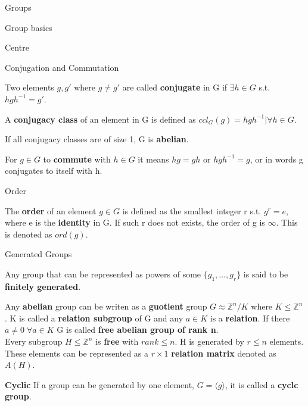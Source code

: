 \documentclass[12pt, letterpaper]{article}
\begin{document}
\begin{section}{Groups}
\begin{subsection}{Group basics}
\begin{subsubsection}{Centre}
    \end{subsubsection}

    \begin{subsubsection}{Conjugation and Commutation}

      Two elements \(g, g'\) where \(g \neq g'\) are called \textbf{conjugate} in G
      if \(\exists h \in G \) s.t. \(hgh^{-1} = g'\).

      A \textbf{conjugacy class} of an element in G is defined as
      \(ccl_{G}(g) = {hgh^{-1} | \forall h \in G}\).

      If all conjugacy classes are of size 1, G is \textbf{abelian}.

      For \(g \in G\) to \textbf{commute} with \(h \in G\) it means \(hg = gh\)
      or \(hgh^{-1} = g\), or in words g conjugates to itself with h.

    \end{subsubsection}

    \begin{subsubsection}{Order}

      The \textbf{order} of an element \(g \in G\) is defined as the smallest
      integer r s.t. \(g^{r} = e\), where e is the \textbf{identity} in G.
      If such r does not exists, the order of g is \(\infty\).
      This is denoted as \(ord(g)\).

    \end{subsubsection}

    \begin{subsubsection}{Generated Groups}

      Any group that can be represented as powers of some
      \(\{ g_{1}, \dots , g_{r} \}\) is said to be \textbf{finitely generated}.

      Any \textbf{abelian} group can be writen as a \textbf{guotient} group
      \(G \approx \mathbb{Z}^{n} / K\) where \(K \leq \mathbb{Z}^{n}\). K is
      called a \textbf{relation subgroup} of G and any \(a \in K\) is a
      \textbf{relation}. If there \(a \neq 0 \; \forall a \in K\) G is called
      \textbf{free abelian group of rank n}. \\
      Every subgroup \(H \leq \mathbb{Z}^{n}\) is \textbf{free} with
      \(rank \leq n\). H is generated by \(r \leq n\) elements. These elements
      can be represented as a \(r \times 1\) \textbf{relation matrix} denoted as
      \(A(H)\).

      \textbf{Cyclic}
      If a group can be generated by one element, \(G = \langle g \rangle\),
      it is called a \textbf{cyclc group}.


\end{subsubsection}
\end{subsection}
\end{section}
\end{document}
